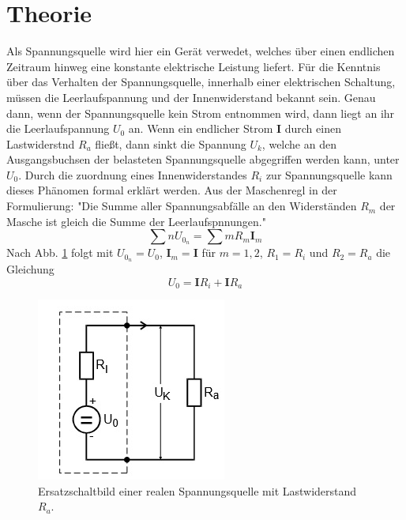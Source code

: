 \section{Theorie}
\label{sec:Theorie}
Als Spannungsquelle wird hier ein Gerät verwedet, welches über einen endlichen Zeitraum hinweg eine konstante elektrische Leistung liefert.
Für die Kenntnis über das Verhalten der Spannungsquelle, innerhalb einer elektrischen Schaltung, müssen die Leerlaufspannung und der Innenwiderstand bekannt sein.
Genau dann, wenn der Spannungsquelle kein Strom entnommen wird, dann liegt an ihr die Leerlaufspannung $U_0$ an.
Wenn ein endlicher Strom $\symbf{I}$ durch einen Lastwiderstnd $R_a$ fließt, dann sinkt die Spannung $U_k$, welche an den Ausgangsbuchsen der belasteten Spannungsquelle abgegriffen werden kann, unter $U_0$.
Durch die zuordnung eines Innenwiderstandes $R_i$ zur Spannungsquelle kann dieses Phänomen formal erklärt werden.
Aus der Maschenregl in der Formulierung: "Die Summe aller Spannungsabfälle an den Widerständen $R_m$ der Masche ist gleich die Summe der Leerlaufspnnungen."
\begin{equation}
  \sum\limits{n} U_{0_n} = \sum\limits{m} R_m \symbf{I}_m
  \label{eqn:eq1}
\end{equation} 
Nach Abb. \ref{fig:abb1} folgt mit $U_{0_n} = U_0$, $\symbf{I}_m = \symbf{I}$ für $m = 1, 2$, $R_1 = R_i$ und $R_2 = R_a$ die Gleichung
\begin{equation}
  U_0 = \symbf{I} R_i + \symbf{I} R_a
  \label{eqn:eq2}
\end{equation}
\begin{figure}
  \centering
  \includegraphics{data/abb1.jpg}
  \caption{Ersatzschaltbild einer realen Spannungsquelle mit Lastwiderstand $R_a$. \cite{V301}}
  \label{fig:abb1}
\end{figure}
\\

